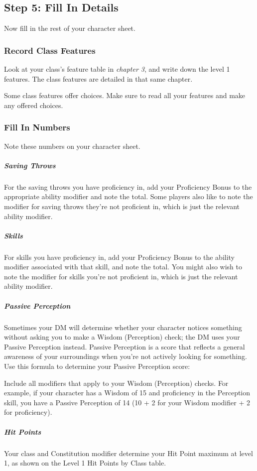 \documentclass[10pt,a4paper,twoside,bg=print,twocolumn,openany,nodeprecatedcode]{dndbook}
\begin{document}
\subsection{Step 5: Fill In Details}
Now fill in the rest of your character sheet.

\subsubsection{Record Class Features}
Look at your class's feature table in \textit{chapter 3}, and write down the level 1 features. The class features are detailed in that same chapter.

Some class features offer choices. Make sure to read all your features and make any offered choices.

\subsubsection{Fill In Numbers}
Note these numbers on your character sheet.

\subparagraph{Saving Throws}
For the saving throws you have proficiency in, add your Proficiency Bonus to the appropriate ability modifier and note the total. Some players also like to note the modifier for saving throws they're not proficient in, which is just the relevant ability modifier.

\subparagraph{Skills}
For skills you have proficiency in, add your Proficiency Bonus to the ability modifier associated with that skill, and note the total. You might also wish to note the modifier for skills you're not proficient in, which is just the relevant ability modifier.

\subparagraph{Passive Perception}
Sometimes your DM will determine whether your character notices something without asking you to make a Wisdom (Perception) check; the DM uses your Passive Perception instead. Passive Perception is a score that reflects a general awareness of your surroundings when you're not actively looking for something. Use this formula to determine your Passive Perception score:

Include all modifiers that apply to your Wisdom (Perception) checks. For example, if your character has a Wisdom of 15 and proficiency in the Perception skill, you have a Passive Perception of 14 (10 + 2 for your Wisdom modifier + 2 for proficiency).

\subparagraph{Hit Points}
Your class and Constitution modifier determine your Hit Point maximum at level 1, as shown on the Level 1 Hit Points by Class table.
\end{document}
